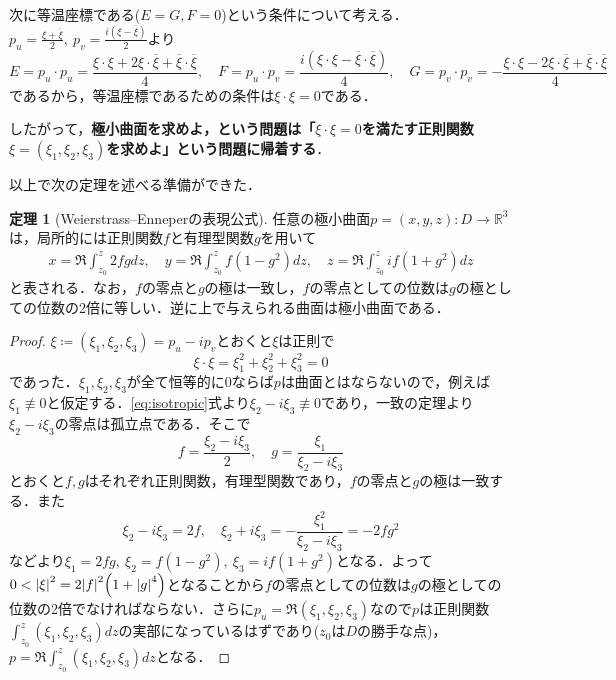 \documentclass[a4j]{ltjsarticle}
\newcommand{\Rset}{\mathbb{R}}
\numberwithin{equation}{section}
\theoremstyle{definition}
\newtheorem{thm}{定理}[section]
\begin{document}
次に等温座標である($E=G, F=0$)という条件について考える．$p_u=\frac{\xi+\overline{\xi}}{2},\ p_v=\frac{i(\xi-\overline{\xi})}{2}$より
\begin{equation}
    E=p_u\cdot p_u=\frac{\xi\cdot \xi+2\xi\cdot \overline{\xi}+\overline{\xi}\cdot \overline{\xi}}{4},\quad F=p_u\cdot p_v=\frac{i(\xi\cdot \xi-\overline{\xi}\cdot \overline{\xi})}{4},\quad G=p_v\cdot p_v=-\frac{\xi\cdot \xi-2\xi\cdot \overline{\xi}+\overline{\xi}\cdot \overline{\xi}}{4}
\end{equation}
であるから，等温座標であるための条件は$\xi\cdot \xi=0$である．

したがって，\textbf{極小曲面を求めよ，という問題は「$\xi\cdot \xi=0$を満たす正則関数$\xi=(\xi_1,\xi_2,\xi_3)$を求めよ」という問題に帰着する}．

以上で次の定理を述べる準備ができた．
\begin{thm}[Weierstrass--Enneperの表現公式]
    任意の極小曲面$p=(x,y,z):D\to\Rset^3$は，局所的には正則関数$f$と有理型関数$g$を用いて
    \begin{align}
        x=\Re\int_{z_0}^z 2fgdz,\quad y=\Re\int_{z_0}^z f(1-g^2)dz,\quad z=\Re\int_{z_0}^z if(1+g^2) dz
    \end{align}
    と表される．なお，$f$の零点と$g$の極は一致し，$f$の零点としての位数は$g$の極としての位数の2倍に等しい．逆に上で与えられる曲面は極小曲面である．
\end{thm}
\begin{proof}
    $\xi\coloneq (\xi_1,\xi_2,\xi_3)=p_u-ip_v$とおくと$\xi$は正則で
    \begin{equation}
        \xi\cdot\xi=\xi_1^2+\xi_2^2+\xi_3^2=0\label{eq:isotropic}    
    \end{equation}
    であった．$\xi_1,\xi_2,\xi_3$が全て恒等的に0ならば$p$は曲面とはならないので，例えば$\xi_1\not\equiv0$と仮定する．\eqref{eq:isotropic}式より$\xi_2-i\xi_3\not\equiv0$であり，一致の定理より$\xi_2-i\xi_3$の零点は孤立点である．そこで
    \begin{equation}
        f=\frac{\xi_2-i\xi_3}{2},\quad g=\frac{\xi_1}{\xi_2-i\xi_3}
    \end{equation}
    とおくと$f,g$はそれぞれ正則関数，有理型関数であり，$f$の零点と$g$の極は一致する．また
    \begin{equation}
        \xi_2-i\xi_3=2f,\quad \xi_2+i\xi_3=-\frac{\xi_1^2}{\xi_2-i\xi_3}=-2fg^2
    \end{equation}
    などより$\xi_1=2fg,\ \xi_2=f(1-g^2),\ \xi_3=if(1+g^2)$となる．よって$0<\abs{\xi}^2=2\abs{f}^2\qty(1+\abs{g}^4)$となることから$f$の零点としての位数は$g$の極としての位数の2倍でなければならない．さらに$p_u=\Re (\xi_1,\xi_2,\xi_3)$なので$p$は正則関数$\int_{z_0}^z(\xi_1,\xi_2,\xi_3)dz$の実部になっているはずであり($z_0$は$D$の勝手な点)，$p=\Re \int_{z_0}^z (\xi_1,\xi_2,\xi_3)dz$となる．
\end{proof}
\end{document}
